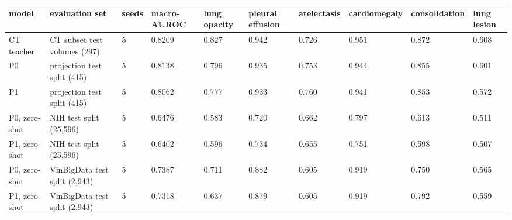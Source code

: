 \begin{tabular}{llllllllll}
\toprule
model & evaluation set & seeds & macro-AUROC & lung opacity & pleural effusion & atelectasis & cardiomegaly & consolidation & lung lesion \\
\midrule
CT teacher & CT subset test volumes (297) & 5 & 0.8209 & 0.827 & 0.942 & 0.726 & 0.951 & 0.872 & 0.608 \\
P0 & projection test split (415) & 5 & 0.8138 & 0.796 & 0.935 & 0.753 & 0.944 & 0.855 & 0.601 \\
P1 & projection test split (415) & 5 & 0.8062 & 0.777 & 0.933 & 0.760 & 0.941 & 0.853 & 0.572 \\
P0, zero-shot & NIH test split (25,596) & 5 & 0.6476 & 0.583 & 0.720 & 0.662 & 0.797 & 0.613 & 0.511 \\
P1, zero-shot & NIH test split (25,596) & 5 & 0.6402 & 0.596 & 0.734 & 0.655 & 0.751 & 0.598 & 0.507 \\
P0, zero-shot & VinBigData test split (2,943) & 5 & 0.7387 & 0.711 & 0.882 & 0.605 & 0.919 & 0.750 & 0.565 \\
P1, zero-shot & VinBigData test split (2,943) & 5 & 0.7318 & 0.637 & 0.879 & 0.605 & 0.919 & 0.792 & 0.559 \\
\bottomrule
\end{tabular}
